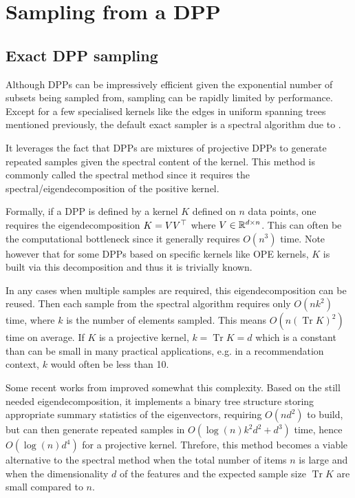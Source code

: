 \section{Sampling from a DPP}
\label{sec__sampling_DPP}
\subsection{Exact DPP sampling}


Although DPPs can be impressively efficient given the exponential number of subsets being sampled from, sampling can be rapidly limited by performance. 
Except for a few specialised kernels like the edges in uniform spanning trees mentioned previously, the default exact sampler is a spectral algorithm due to \cite{hough2006_hkpv}.

It leverages the fact that DPPs are mixtures of projective DPPs to generate repeated samples given the spectral content of the kernel. This method is commonly called the spectral method since it requires the spectral/eigendecomposition of the positive kernel. 

Formally, if a DPP is defined by a kernel $K$ defined on $n$ data points, one requires the eigendecomposition $K= V V^\top$  where $V \in \mathbb{R}^{d \times n}$. 
This can often be the computational bottleneck since it generally requires $O(n^3)$ time. Note however that for some DPPs based on specific kernels like OPE kernels, $K$ is built via this decomposition and thus it is trivially known.

In any cases when multiple samples are required, this eigendecomposition can be reused. Then each sample from the spectral algorithm requires only $O(n k^2)$ time, where $k$ is the number of elements sampled. This means $O(n (\operatorname{Tr} K)^2)$ time on average. If $K$ is a projective kernel, $k = \operatorname{Tr} K = d$ which is a constant than can be small in many practical applications, e.g. in a recommendation context, $k$ would often be less than 10.

Some recent works from \cite{gillenwater2019_treebased_fast_dpp_sampling} improved somewhat this complexity. Based on the still needed eigendecomposition, it implements a binary tree structure storing appropriate summary statistics of the eigenvectors, requiring $O(n d^2)$ to build, but can then generate repeated
samples in $O(\log(n)k^2d^2 + d^3)$ time, hence $O(\log(n)d^4)$ for a projective kernel. Threfore, this method becomes a viable alternative to the spectral method when the total
number of items $n$ is large and when the dimensionality $d$ of the
features and the expected sample size $\operatorname{Tr} K$ are small compared to $n$.





